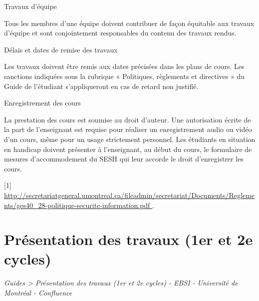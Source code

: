 \documentclass [12 pt]{article}
\begin{document}
            
                
                    Travaux d'équipe
                
            
            Tous les membres d'une équipe doivent contribuer de façon équitable aux travaux
                d'équipe et sont conjointement responsables du contenu des travaux rendus.
            
                
                    Délais et dates de remise des travaux
                
            
            Les travaux doivent être remis aux dates précisées dans les plans de cours. Les
                sanctions indiquées sous la rubrique « Politiques, règlements et directives » du
                Guide de l'étudiant s'appliqueront en cas de retard non justifié.
            
                
                    Enregistrement des cours
                
            
            La prestation des cours est soumise au droit d'auteur. Une autorisation écrite de la
                part de l'enseignant est requise pour réaliser un enregistrement audio ou vidéo d'un
                cours, même pour un usage strictement personnel.
            Les étudiants en situation en handicap doivent présenter à l'enseignant, au début du
                cours, le formulaire de mesures d'accommodement du SESH qui leur accorde le droit
                d'enregistrer les cours.
        
        
            
            [1] 
        \href{
        http://secretariatgeneral.umontreal.ca/fileadmin/secretariat/Documents/Reglements/ges40_28-politique-securite-information.pdf
        } {
        http://secretariatgeneral.umontreal.ca/fileadmin/secretariat/Documents/Reglements/ges40_28-politique-securite-information.pdf
        }
    .
        
    
    
        \newpage
        \section {
        Présentation des travaux (1er et 2e cycles)
        }
        
        
        
        \textit{
        Guides > Présentation des travaux (1er et 2e cycles) - EBSI - Université de
            Montréal - Confluence
        }
    
\end{document}
